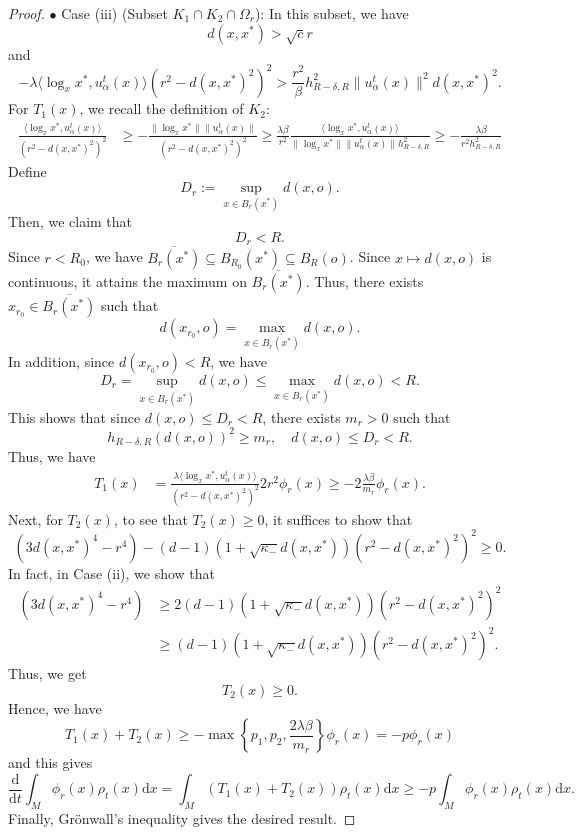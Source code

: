 \documentclass[11pt]{amsart}
\newcommand{\kp}{\kappa}
\def\d{\mathrm{d}}
\begin{document}
\begin{proof}
 

\noindent $\bullet$ Case (iii) (Subset $K_1 \cap K_2 \cap \Omega_r$): In this subset, we have
\[
d(x,x^*)>\sqrt cr
\]
and
\[
-\lambda \langle \log_xx^*,u_\alpha^t(x)\rangle (r^2 - d(x,x^*)^2)^2 > \frac{r^2}{\beta} h_{R-\delta,R}^2\|u_\alpha^t(x)\|^2 d(x,x^*)^2 .
\]
For $T_1(x)$, we recall the definition of $K_2$:
\begin{align*}
 \frac{   \langle \log_xx^*,u_\alpha^t(x)\rangle }{  (r^2- d(x,x^*)^2)^2 }  &\geq -\frac{ \| \log_xx^* \| \| u_\alpha^t(x) \|  }{  (r^2- d(x,x^*)^2)^2  } \geq  \frac{\lambda \beta}{r^2} \frac{  \langle \log_xx^*, u_\alpha^t(x)\rangle}{ \|\log_xx^*\| \|u_\alpha^t(x)\| h_{R-\delta,R}^2} \geq -\frac{\lambda \beta}{r^2 h_{R-\delta,R}^2}
\end{align*} 
Define
\[
D_r:= \sup_{x\in B_r(x^*)} d(x,o).
\]
Then, we claim that 
\[
D_r <R.
\]
Since $r<R_0$, we have $\overline{B_r(x^*)} \subseteq B_{R_0}(x^*) \subseteq B_R(o)$. Since $x\mapsto d(x,o)$ is continuous, it attains the maximum on $\overline{B_r(x^*)}$. Thus, there exists $x_{r_0} \in \overline{B_r(x^*)}$ such that
\[
d(x_{r_0},o) = \max_{x\in \overline{B_r(x^*)}} d(x,o).
\]
In addition, since $d(x_{r_0},o)<R$, we have
\[
D_r = \sup_{x\in \overline{B_r(x^*)}} d(x,o) \leq \max_{x\in \overline{B_r(x^*)}} d(x,o)  <R.
\]
This shows that since $d(x,o)\leq D_r<R$,  there exists $m_r>0$ such that 
\begin{equation} \label{mr}
h_{R-\delta,R}(d(x,o))^2 \geq m_r,\quad d(x,o)\leq D_r<R.
\end{equation}
Thus, we have
\begin{align*}
T_1(x)& =  \frac{ \lambda \langle \log_xx^*,u_\alpha^t(x)\rangle }{  (r^2- d(x,x^*)^2)^2 } 2r^2\phi_r(x)  \geq -2\frac{\lambda \beta}{m_r} \phi_r(x).
\end{align*}
Next, for $T_2(x)$, to see that $T_2(x)\geq0$, it suffices to show that
\[
 (3d(x,x^*)^4-r^4  )  -(d-1)(1+\sqrt{\kp_-}d(x,x^*)) (r^2 - d(x,x^*)^2)^2  \geq0 .
 \]
 In fact, in Case (ii), we show that
 \begin{align*}
 (3d(x,x^*)^4-r^4  ) &\geq 2(d-1)(1+\sqrt{\kappa_-}d(x,x^*) )(r^2 - d(x,x^*)^2)^2  \\
 &\geq (d-1)(1+\sqrt{\kappa_-}d(x,x^*)) (r^2 - d(x,x^*)^2)^2.
 \end{align*}
Thus, we get
\[
T_2(x)\geq0.
\]
Hence, we have
\[
T_1(x) + T_2(x) \geq -\max\left\{ p_1,p_2, \frac{2\lambda \beta}{m_r}\right\} \phi_r(x) =-p\phi_r(x)
\]
and this gives
\[
\frac{\d}{\d t} \int_M \phi_r(x) \rho_t(x) \d x  = \int_M (T_1(x) + T_2(x) ) \rho_t(x) \d x  \geq -p\int_M  \phi_r(x) \rho_t(x) \d x.
\]
Finally, Gr\"onwall's inequality gives the desired result. 
\end{proof}
\end{document}
